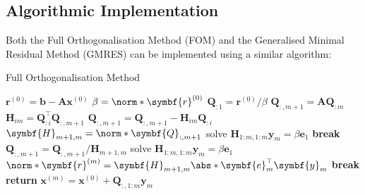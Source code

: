 \documentclass{article}
\begin{document}
\subsection{Algorithmic Implementation}
Both the Full Orthogonalisation Method (FOM) and the Generalised
Minimal Residual Method (GMRES) can be implemented using a similar
algorithm:
\begin{algorithm}[H]
    \caption{Full Orthogonalisation Method}
    \begin{algorithmic}
        \State \(\symbf{r}^{\left( 0 \right)} = \symbf{b} - \symbf{A} \symbf{x}^{\left( 0 \right)}\)
        \State \(\beta = \norm*{\symbf{r}^{\left( 0 \right)}}\)
        \State \(\symbf{Q}_{:1} = \symbf{r}^{\left( 0 \right)}/\beta\)
        \State \(\symbf{Q}_{:,m+1} = \symbf{A} \symbf{Q}_{:m}\) 
        \State \(\symbf{H}_{im} = \symbf{Q}_{:i}^\top \symbf{Q}_{:,m + 1}\)
        \State \(\symbf{Q}_{:,m+1} = \symbf{Q}_{:,m+1} - \symbf{H}_{im} \symbf{Q}_{:i}\)
        \EndFor
        \State \(\symbf{H}_{m+1,m} = \norm*{\symbf{Q}_{:,m+1}}\)
        \Statex
         
        \State solve \(\symbf{H}_{1:m,1:m} \symbf{y}_m = \beta \symbf{e}_1\)
        \State \textbf{break}
        \EndIf
        \State \(\symbf{Q}_{:,m+1} = \symbf{Q}_{:,m+1} / \symbf{H}_{m+1,m}\)
        \Statex
        \State solve \(\symbf{H}_{1:m,1:m} \symbf{y}_m = \beta \symbf{e}_1\) 
        \State \(\norm*{\symbf{r}^{\left( m \right)}} = \symbf{H}_{m+1,m} \abs*{\symbf{e}_m^\top \symbf{y}_m}\)
         
        \State \textbf{break}
        \EndIf
        \EndFor
        \State \textbf{return} \(\symbf{x}^{\left( m \right)} = \symbf{x}^{\left( 0 \right)} + \symbf{Q}_{:,1:m} \symbf{y}_m\)
    \end{algorithmic}
\end{algorithm}
\end{document}
